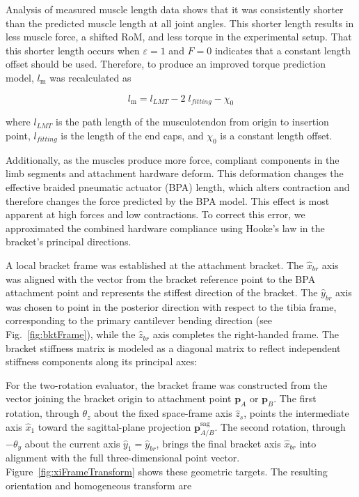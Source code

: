 Analysis of measured muscle length data shows that it was consistently shorter than the predicted muscle length at all joint angles. This shorter length results in less muscle force, a shifted RoM, and less torque in the experimental setup. That this shorter length occurs when $\varepsilon=1$ and $F=0$ indicates that a constant length offset should be used. Therefore, to produce an improved torque prediction model, $l_\text{m}$ was recalculated as

\begin{equation}
    l_\text{m} = l_{LMT} - 2\;l_{fitting} - \chi_{0} 
    \label{eq:Lm}
\end{equation}

where $l_{LMT}$ is the path length of the musculotendon from origin to insertion point, $l_{fitting}$ is the length of the end caps, and $\chi_{0}$ is a constant length offset. 

Additionally, as the muscles produce more force, compliant components in the limb segments and attachment hardware deform. This deformation changes the effective braided pneumatic actuator (BPA) length, which alters contraction and therefore changes the force predicted by the BPA model. This effect is most apparent at high forces and low contractions. To correct this error, we approximated the combined hardware compliance using Hooke's law in the bracket's principal directions.

A local bracket frame was established at the attachment bracket. The $\hat{x}_{br}$ axis was aligned with the vector from the bracket reference point to the BPA attachment point and represents the stiffest direction of the bracket. The $\hat{y}_{br}$ axis was chosen to point in the posterior direction with respect to the tibia frame, corresponding to the primary cantilever bending direction (see Fig.~\ref{fig:bktFrame}), while the $\hat{z}_{br}$ axis completes the right-handed frame. The bracket stiffness matrix is modeled as a diagonal matrix to reflect independent stiffness components along its principal axes:

For the two-rotation evaluator, the bracket frame was constructed from the vector joining the bracket origin to attachment point $\mathbf{p}_{A}$ or $\mathbf{p}_{B}$. The first rotation, through $\theta_z$ about the fixed space-frame axis $\hat z_s$, points the intermediate axis $\hat x_1$ toward the sagittal-plane projection $\mathbf{p}_{A/B}^{\mathrm{sag}}$. The second rotation, through $-\theta_y$ about the current axis $\hat y_1=\hat y_{br}$, brings the final bracket axis $\hat x_{br}$ into alignment with the full three-dimensional point vector. Figure~\ref{fig:xiFrameTransform} shows these geometric targets. The resulting orientation and homogeneous transform are

